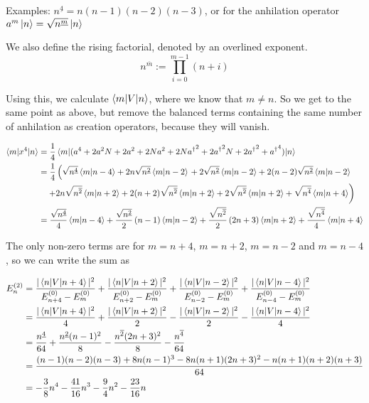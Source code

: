 \documentclass[a4paper,german,12pt,smallheadings]{scrartcl}
\begin{document}
\begin{enumerate}[a)]
    Examples: $n^{\underline{4}} = n (n-1) (n-2) (n-3)$, or for the anhilation
    operator $a^m \ket{n} = \sqrt{n^{\underline{m}}} \ket{n}$

    We also define the rising factorial, denoted by an overlined exponent.
    \begin{equation*}
      n^{\overline{m}} := \prod_{i=0}^{m-1} (n+i)
    \end{equation*}

    Using this, we calculate $\braket{m|V|n}$, where we know that $m \neq n$.
    So we get to the same point as above, but remove the balanced terms
    containing the same number of anhilation as creation operators, because
    they will vanish.

    \begin{align*}
      \braket{m|x^4|n} &= \frac{1}{4} \braket{m|(a^4 + 2a^2N + 2a^2 + 2Na^2 + 2N{a^\dagger}^2 + 2{a^\dagger}^2 N + 2{a^\dagger}^2 + {a^\dagger}^4)|n} \\
                                   &= \frac{1}{4} \left(\sqrt{n^{\underline{4}}} \braket{m|n-4} + 2 n \sqrt{n^{\underline{2}}} \braket{m|n-2} \right.
      + 2 \sqrt{n^{\underline{2}}} \braket{m|n-2} + 2 (n-2) \sqrt{n^{\underline{2}}} \braket{m|n-2} \\
    & \left. \quad + 2n \sqrt{n^{\overline 2}} \braket{m|n+2}+ 2(n+2) \sqrt{n^{\overline 2}} \braket{m|n+2} + 2 \sqrt{n^{\overline 2}} \braket{m|n+2} + \sqrt{n^{\overline 4}} \braket{m|n+4} \right) \\
    &=  \frac{\sqrt{n^{\underline 4}}}{4}            \braket{m|n-4}
      + \frac{\sqrt{n^{\underline 2}}}{2} \del{n-1}  \braket{m|n-2}
      + \frac{\sqrt{n^{\overline  2}}}{2} \del{2n+3} \braket{m|n+2}
      + \frac{\sqrt{n^{\overline  4}}}{4}            \braket{m|n+4}
    \end{align*}

    The only non-zero terms are for $m=n+4$, $m=n+2$, $m=n-2$ and $m=n-4$, so
    we can write the sum as

    \begin{align*}
      E_n^{(2)} &=
      \frac{|\braket{n|V|n+4}|^2}{E^{(0)}_{n+4} - E^{(0)}_{m}} +
      \frac{|\braket{n|V|n+2}|^2}{E^{(0)}_{n+2} - E^{(0)}_{m}} +
      \frac{|\braket{n|V|n-2}|^2}{E^{(0)}_{n-2} - E^{(0)}_{m}} +
      \frac{|\braket{n|V|n-4}|^2}{E^{(0)}_{n-4} - E^{(0)}_{m}} \\
      &=
      \frac{|\braket{n|V|n+4}|^2}{4} +
      \frac{|\braket{n|V|n+2}|^2}{2}
      -\frac{|\braket{n|V|n-2}|^2}{2}
      -\frac{|\braket{n|V|n-4}|^2}{4} \\
      &=
      \frac{n^{\underline 4}}{64}
      +\frac{n^{\underline 2}(n-1)^2}{8}
      -\frac{n^{\overline 2}(2n+3)^2}{8}
      -\frac{n^{\overline 4}}{64} \\
      &=
      \frac{(n-1)(n-2)(n-3) + 8 n(n-1)^3 - 8n(n+1)(2n+3)^2 - n(n+1)(n+2)(n+3)}{64} \\
      &= -\frac{3}{8}n^4 - \frac{41}{16}n^3 - \frac{9}{4}n^2 - \frac{23}{16} n
    \end{align*}


\end{enumerate}
\end{document}
